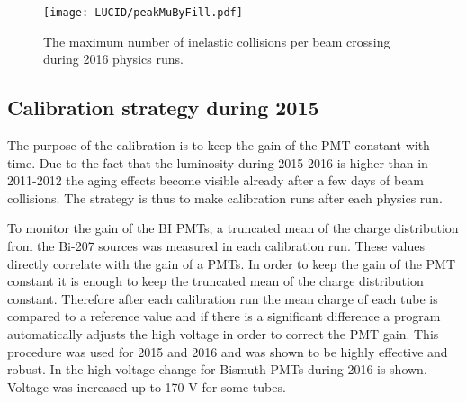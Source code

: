 \begin{figure}
\centering
\texttt{[image: LUCID/peakMuByFill.pdf]}
\caption{The maximum number of inelastic collisions per beam crossing during 2016 physics runs.}
\label{fig:peakMuByFill}
\end{figure}

\subsection{Calibration strategy during 2015}
\label{subsec:calibPerformance}


The purpose of the calibration is to keep the gain of the PMT constant with time.
Due to the fact that the luminosity during 2015-2016 is higher than in 2011-2012
the aging effects become visible already after a few days of beam collisions.
The strategy is thus to make calibration runs after each physics run.

To monitor the gain of the BI PMTs, a truncated mean of the charge distribution from the Bi-207 sources was measured in each calibration run.
These values directly correlate with the gain of a PMTs. 
In order to keep the gain of the PMT constant it is enough to keep the truncated mean of the charge distribution constant.
Therefore after each calibration run the mean charge of each tube is compared to a reference value and if there is a significant difference a program 
automatically adjusts the high voltage in order to correct the PMT gain.
This procedure was used for 2015 and 2016 and was shown to be highly effective and robust.
In  the high voltage change for Bismuth PMTs during 2016 is shown. 
Voltage was increased up to 170 V for some tubes.


